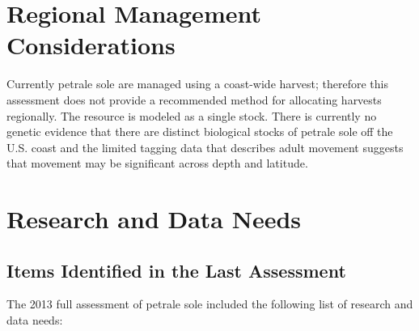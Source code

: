 \documentclass[12pt,]{article}
\begin{document}
\section{Regional Management
Considerations}\label{regional-management-considerations}

Currently petrale sole are managed using a coast-wide harvest; therefore
this assessment does not provide a recommended method for allocating
harvests regionally. The resource is modeled as a single stock. There is
currently no genetic evidence that there are distinct biological stocks
of petrale sole off the U.S. coast and the limited tagging data that
describes adult movement suggests that movement may be significant
across depth and latitude.

\section{Research and Data Needs}\label{research-and-data-needs-1}

\subsection{Items Identified in the Last
Assessment}\label{items-identified-in-the-last-assessment}

The 2013 full assessment of petrale sole included the following list of
research and data needs:
\end{document}
